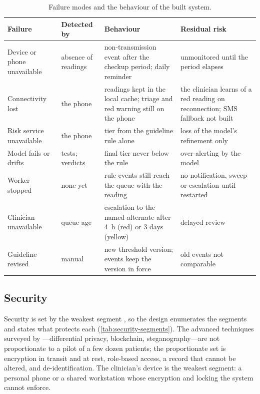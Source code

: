\begin{table}[htbp]
\centering\footnotesize
\caption{Failure modes and the behaviour of the built system.}\label{tab:failure-modes}
\begin{tabularx}{\textwidth}{@{}>{\raggedright\arraybackslash}p{2.8cm} >{\raggedright\arraybackslash}p{2.2cm} X >{\raggedright\arraybackslash}p{3.2cm}@{}}
\toprule
\textbf{Failure} & \textbf{Detected by} & \textbf{Behaviour} & \textbf{Residual risk} \\
\midrule
Device or phone unavailable & absence of readings & non-transmission event after the checkup period; daily reminder & unmonitored until the period elapses \\
Connectivity lost & the phone & readings kept in the local cache; triage and red warning still on the phone & the clinician learns of a red reading on reconnection; SMS fallback not built \\
Risk service unavailable & the phone & tier from the guideline rule alone & loss of the model's refinement only \\
Model fails or drifts & tests; verdicts & final tier never below the rule & over-alerting by the model \\
Worker stopped & none yet & rule events still reach the queue with the reading & no notification, sweep or escalation until restarted \\
Clinician unavailable & queue age & escalation to the named alternate after 4~h (red) or 3 days (yellow) & delayed review \\
Guideline revised & manual & new threshold version; events keep the version in force & old events not comparable \\
\bottomrule
\end{tabularx}
\end{table}

\subsection{Security}\label{sec:security}

Security is set by the weakest segment \parencite{mucchi2021}, so the design enumerates the segments and states what protects each (\cref{tab:security-segments}). The advanced techniques surveyed by \textcite{liu2025review}---differential privacy, blockchain, steganography---are not proportionate to a pilot of a few dozen patients; the proportionate set is encryption in transit and at rest, role-based access, a record that cannot be altered, and de-identification. The clinician's device is the weakest segment: a personal phone or a shared workstation whose encryption and locking the system cannot enforce.


